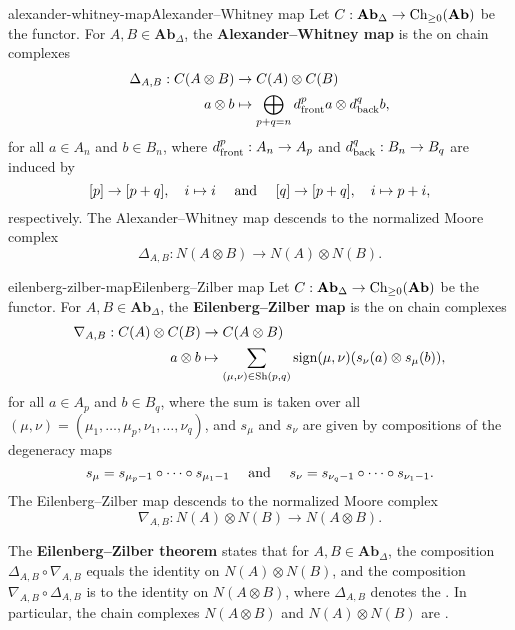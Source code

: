 \begin{topic}{alexander-whitney-map}{Alexander--Whitney map}
    Let $C : \textbf{Ab}_\Delta \to \textup{Ch}_{\ge 0}(\textbf{Ab})$ be the  functor. For $A, B \in \textbf{Ab}_\Delta$, the \textbf{Alexander--Whitney map} is the  on chain complexes
    \[ \begin{aligned}
        \Delta_{A, B} : C(A \otimes B) &\to C(A) \otimes C(B) \\
        a \otimes b &\mapsto \bigoplus_{p + q = n} d_\textup{front}^p a \otimes d_\textup{back}^q b ,
    \end{aligned} \]
    for all $a \in A_n$ and $b \in B_n$, where $d_\textup{front}^p : A_n \to A_p$ and $d_\textup{back}^q : B_n \to B_q$ are induced by
    \[ [p] \to [p + q], \quad i \mapsto i \quad \textup{ and } \quad [q] \to [p + q], \quad i \mapsto p + i , \]
    respectively. The Alexander--Whitney map descends to the normalized Moore complex
    \[ \Delta_{A, B} : N(A \otimes B) \to N(A) \otimes N(B) . \]
\end{topic}

\begin{topic}{eilenberg-zilber-map}{Eilenberg--Zilber map}
    Let $C : \textbf{Ab}_\Delta \to \textup{Ch}_{\ge 0}(\textbf{Ab})$ be the  functor. For $A, B \in \textbf{Ab}_\Delta$, the \textbf{Eilenberg--Zilber map} is the  on chain complexes
    \[ \begin{aligned}
        \nabla_{A, B} : C(A) \otimes C(B) &\to C(A \otimes B) \\
        a \otimes b &\mapsto \sum_{(\mu, \nu) \in \textup{Sh}(p, q)} \textup{sign}(\mu, \nu) (s_\nu(a) \otimes s_\mu(b)) ,
    \end{aligned} \]
    for all $a \in A_p$ and $b \in B_q$, where the sum is taken over all  $(\mu, \nu) = (\mu_1, \ldots, \mu_p, \nu_1, \ldots, \nu_q)$, and $s_\mu$ and $s_\nu$ are given by compositions of the degeneracy maps
    \[ s_\mu = s_{\mu_p - 1} \circ \cdots \circ s_{\mu_1 - 1} \quad \textup{ and } \quad s_\nu = s_{\nu_q - 1} \circ \cdots \circ s_{\nu_1 - 1} . \]
    The Eilenberg--Zilber map descends to the normalized Moore complex
    \[ \nabla_{A, B} : N(A) \otimes N(B) \to N(A \otimes B) . \]
    
    The \textbf{Eilenberg--Zilber theorem} states that for $A, B \in \textbf{Ab}_\Delta$, the composition $\Delta_{A, B} \circ \nabla_{A, B}$ equals the identity on $N(A) \otimes N(B)$, and the composition $\nabla_{A, B} \circ \Delta_{A, B}$ is  to the identity on $N(A \otimes B)$, where $\Delta_{A, B}$ denotes the . In particular, the chain complexes $N(A \otimes B)$ and $N(A) \otimes N(B)$ are .
\end{topic}

